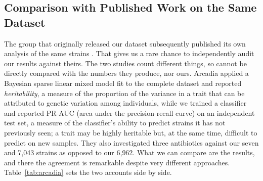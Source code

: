 \FloatBarrier
\subsection{Comparison with Published Work on the Same Dataset}
\label{subsec:published}

The group that originally released our dataset subsequently published its own
analysis of the same strains \cite{york2025amr}. That gives us a rare chance
to independently audit our results against theirs. The two studies count different
things, so cannot be directly compared with the numbers they produce, nor ours.
Arcadia applied a Bayesian sparse linear mixed model fit to the complete dataset
and reported \emph{heritability}, a measure of the proportion of the variance in
a trait that can be attributed to genetic variation among individuals, while we
trained a classifier and reported PR-AUC (area under the precision-recall curve)
on an independent test set, a measure of the classifier's ability to predict
strains it has not previously seen; a trait may be highly heritable but, at the
same time, difficult to predict on new samples. They also investigated three
antibiotics against our seven and 7{,}043 strains as opposed to our 6{,}962.
What we can compare are the results, and there the agreement is remarkable
despite very different approaches. Table~\ref{tab:arcadia} sets the two accounts
side by side.

